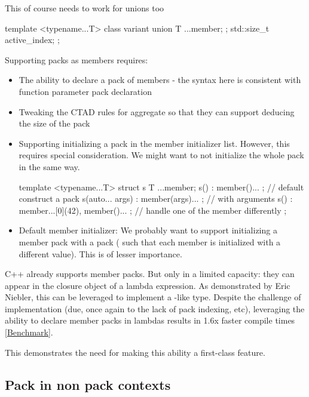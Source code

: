 \documentclass{wg21}
\begin{document}
This of course needs to work for unions too

\begin{colorblock}
template <typename...T>
class variant {
    union {
        T ...member;
    };
    std::size_t active_index;
};
\end{colorblock}

Supporting packs as members requires:

\begin{itemize}
\item The ability to declare a pack of members - the syntax here is consistent with function parameter pack declaration
\item Tweaking the CTAD rules for aggregate so that they can support deducing the size of the pack
\item Supporting initializing a pack in the member initializer list. However, this requires special consideration. We might want to not initialize the whole pack in the same way.

\begin{colorblock}
template <typename...T>
struct s {
     T ...member;
     s() : member()... {}; // default construct a pack
     s(auto... args) : member(args)... {}; // with arguments
     s() : member...[0](42), member()... {}; // handle one of the member differently
};
\end{colorblock}

\item Default member initializer: We probably want to support initializing a member pack with a pack ( such that each member is initialized with a different value). This is of lesser importance.

\end{itemize}

C++ already supports member packs. But only in a limited capacity: they can appear in
the closure object of a lambda expression.
As demonstrated by Eric Niebler, this can be leveraged to implement a -like type.
Despite the challenge of implementation (due, once again to the lack of pack indexing, etc),
leveraging the ability to declare member packs in lambdas results in 1.6x faster compile times
\href{https://build-bench.com/b/xRgaBoiALe2hMmdYtiJnGCfePIA}{[Benchmark]}.

This demonstrates the need for making this ability a first-class feature.

\subsection{Pack in non pack contexts}
\end{document}
